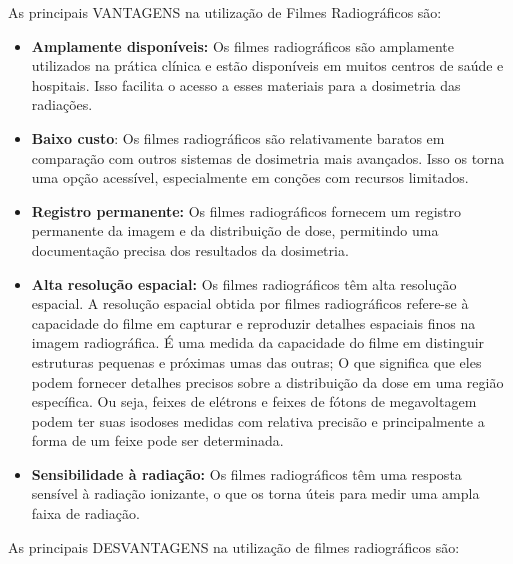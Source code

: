 \documentclass[11pt,a4paper]{article}
\begin{document}
		As principais \textcolor{CarnationPink}{VANTAGENS} na utilização de Filmes Radiográficos são:

		\begin{itemize}[label=\textcolor{CarnationPink}{$\blacktriangleright$}]
			\item \textbf{Amplamente disponíveis:} Os filmes radiográficos são amplamente utilizados na prática clínica e estão disponíveis em muitos centros de saúde e hospitais. Isso facilita o acesso a esses materiais para a dosimetria das radiações.
			\item \textbf{Baixo custo}: Os filmes radiográficos são relativamente baratos em comparação com outros sistemas de dosimetria mais avançados. Isso os torna uma opção acessível, especialmente em conções com recursos limitados.
			\item \textbf{Registro permanente:} Os filmes radiográficos fornecem um registro permanente da imagem e da distribuição de dose, permitindo uma documentação precisa dos resultados da dosimetria.
			\item \textbf{Alta resolução espacial:} Os filmes radiográficos têm alta resolução espacial. A resolução espacial obtida por filmes radiográficos refere-se à capacidade do filme em capturar e reproduzir detalhes espaciais finos na imagem radiográfica. É uma medida da capacidade do filme em distinguir estruturas pequenas e próximas umas das outras; O que significa que eles podem fornecer detalhes precisos sobre a distribuição da dose em uma região específica. Ou seja, feixes de elétrons e feixes de fótons de megavoltagem podem ter suas isodoses medidas com relativa precisão e principalmente a forma de um feixe pode ser determinada.
			\item \textbf{Sensibilidade à radiação:} Os filmes radiográficos têm uma resposta sensível à radiação ionizante, o que os torna úteis para medir uma ampla faixa de radiação.
		\end{itemize}

		As principais \textcolor{CarnationPink}{DESVANTAGENS} na utilização de filmes radiográficos são:
\end{document}
